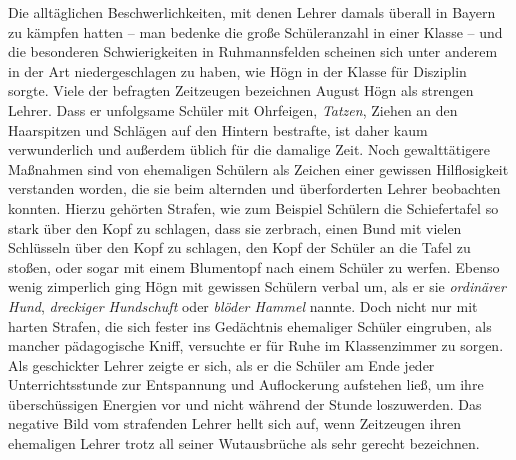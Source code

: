 \documentclass{book}
\begin{document}
Die alltäglichen Beschwerlichkeiten, mit denen Lehrer damals überall in
Bayern zu kämpfen hatten – man bedenke die große Schüleranzahl in einer
Klasse – und die besonderen Schwierigkeiten in Ruhmannsfelden scheinen
sich unter anderem in der Art niedergeschlagen zu haben, wie Högn in
der Klasse für Disziplin sorgte. Viele der befragten Zeitzeugen
bezeichnen August Högn als strengen Lehrer. Dass er unfolgsame Schüler
mit Ohrfeigen, \textit{Tatzen}, Ziehen an den Haarspitzen und Schlägen
auf den Hintern bestrafte, ist daher kaum verwunderlich und außerdem
üblich für die damalige Zeit. Noch gewalt\-tätigere Maßnahmen sind von
ehemaligen Schülern als Zeichen einer gewissen Hilflosigkeit verstanden
worden, die sie beim alternden und überforderten Lehrer beobachten
konnten. Hierzu gehörten Strafen, wie zum Beispiel Schü\-lern die
Schiefertafel so stark über den Kopf zu schlagen, dass sie zerbrach,
einen Bund mit vielen Schlüsseln über den Kopf zu schlagen, den Kopf
der Schüler an die Tafel zu stoßen, oder sogar mit einem Blumentopf
nach einem Schüler zu werfen. Ebenso wenig zimperlich ging Högn mit
gewissen Schülern verbal um, als er sie \textit{ordinärer Hund},
\textit{dreckiger Hundschuft} oder \textit{blöder Hammel} nannte. Doch
nicht nur mit harten Strafen, die sich fester ins Gedächtnis ehemaliger
Schüler eingruben, als mancher pädagogische Kniff, versuchte er für
Ruhe im Klassenzimmer zu sorgen. Als geschickter Lehrer zeigte er sich,
als er die Schüler am Ende jeder Unterrichtsstunde zur Entspannung und
Auflockerung aufstehen ließ, um ihre überschüssigen Energien vor und
nicht während der Stunde loszuwerden. Das negative Bild vom strafenden
Lehrer hellt sich auf, wenn Zeitzeugen ihren ehemaligen Lehrer trotz
all seiner Wutausbrüche als sehr gerecht bezeichnen.
\end{document}
